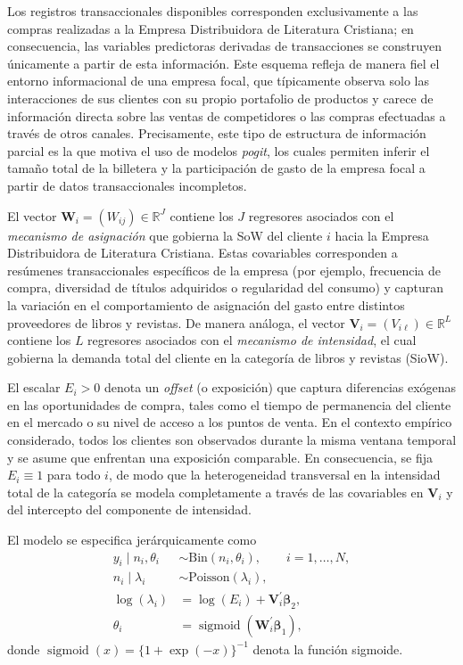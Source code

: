     Los registros transaccionales disponibles corresponden exclusivamente a las compras realizadas a la Empresa Distribuidora de Literatura Cristiana; en consecuencia, las variables predictoras derivadas de transacciones se construyen únicamente a partir de esta información. Este esquema refleja de manera fiel el entorno informacional de una empresa focal, que típicamente observa solo las interacciones de sus clientes con su propio portafolio de productos y carece de información directa sobre las ventas de competidores o las compras efectuadas a través de otros canales. Precisamente, este tipo de estructura de información parcial es la que motiva el uso de modelos \emph{pogit}, los cuales permiten inferir el tamaño total de la billetera y la participación de gasto de la empresa focal a partir de datos transaccionales incompletos.
    
    El vector \(\boldsymbol{W}_i = (W_{ij}) \in \mathbb{R}^J\) contiene los \(J\) regresores asociados con el \emph{mecanismo de asignación} que gobierna la SoW del cliente \(i\) hacia la Empresa Distribuidora de Literatura Cristiana. Estas covariables corresponden a resúmenes transaccionales específicos de la empresa (por ejemplo, frecuencia de compra, diversidad de títulos adquiridos o regularidad del consumo) y capturan la variación en el comportamiento de asignación del gasto entre distintos proveedores de libros y revistas. De manera análoga, el vector \(\boldsymbol{V}_i = (V_{i\ell}) \in \mathbb{R}^L\) contiene los \(L\) regresores asociados con el \emph{mecanismo de intensidad}, el cual gobierna la demanda total del cliente en la categoría de libros y revistas (SioW).
    
    El escalar \(E_i > 0\) denota un \emph{offset} (o exposición) que captura diferencias exógenas en las oportunidades de compra, tales como el tiempo de permanencia del cliente en el mercado o su nivel de acceso a los puntos de venta. En el contexto empírico considerado, todos los clientes son observados durante la misma ventana temporal y se asume que enfrentan una exposición comparable. En consecuencia, se fija \(E_i \equiv 1\) para todo \(i\), de modo que la heterogeneidad transversal en la intensidad total de la categoría se modela completamente a través de las covariables en \(\boldsymbol{V}_i\) y del intercepto del componente de intensidad.
    
    El modelo se especifica jerárquicamente como
    \[
    \begin{aligned}
    y_i \mid n_i, \theta_i
    & \sim
    \mathrm{Bin}\!\left(n_i, \theta_i\right),
    \qquad
    i = 1, \ldots, N,
    \\
    n_i \mid \lambda_i
    & \sim
    \mathrm{Poisson}\!\left(\lambda_i\right),
    \\
    \log(\lambda_i)
    &=
    \log(E_i) + \boldsymbol{V}_i^{\prime}\boldsymbol{\beta}_2,
    \\
    \theta_i
    &=
    \operatorname{sigmoid}\!\left(\boldsymbol{W}_i^{\prime}\boldsymbol{\beta}_1\right),
    \end{aligned}
    \]
    donde \(\operatorname{sigmoid}(x) = \{1+\exp(-x)\}^{-1}\) denota la función sigmoide.
    
